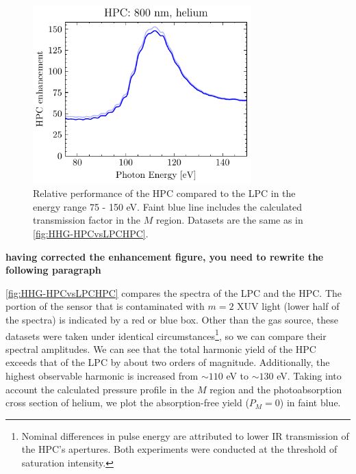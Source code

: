 \begin{figure}
	\centering
	\includegraphics[width=0.75\textwidth]{figures/chap3/HPC_He800nm_enhancement.pdf}
	\caption{Relative performance of the HPC compared to the LPC in the energy range 75 - 150 eV. Faint blue line includes the calculated transmission factor in the $M$ region. Datasets are the same as in \cref{fig:HHG-HPCvsLPCHPC}.}
	\label{fig:HPC_He800nm_enhancement}
\end{figure}

\textbf{having corrected the enhancement figure, you need to rewrite the following paragraph}

\cref{fig:HHG-HPCvsLPCHPC} compares the spectra of the LPC and the HPC. The portion of the sensor that is contaminated with $m=2$ XUV light (lower half of the spectra) is indicated by a red or blue box. Other than the gas source, these datasets were taken under identical circumstances\footnote{Nominal differences in pulse energy are attributed to lower IR transmission of the HPC's apertures. Both experiments were conducted at the threshold of saturation intensity.}, so we can compare their spectral amplitudes. We can see that the total harmonic yield of the HPC exceeds that of the LPC by about two orders of magnitude. Additionally, the highest observable harmonic is increased from $\sim 110$ eV to $\sim 130$ eV.  Taking into account the calculated pressure profile in the $M$ region and the photoabsorption cross section of helium, we plot the absorption-free yield ($P_M =0$) in faint blue.

